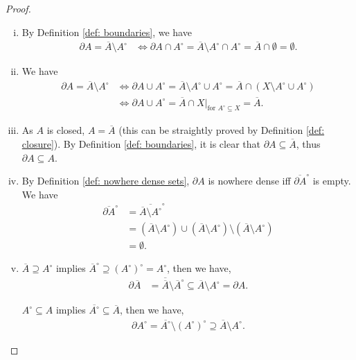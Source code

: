 \begin{proposition}
\begin{proof}
\begin{enumerate}[(i)]
			\item
			By Definition \ref{def: boundaries}, we have
			$$
			\begin{aligned}
				\partial A = \overline A \setminus A^\circ &\iff \partial A \cap A^\circ = \overline A \setminus A^\circ \cap A^\circ = \overline A \cap \emptyset = \emptyset.
			\end{aligned}
			$$
			
			\item
			We have
			$$
			\begin{aligned}
				\partial A = \overline A \setminus A^\circ &\iff \partial A \cup A^\circ = \overline A \setminus A^\circ \cup A^\circ = \overline A \cap (X \setminus A^\circ \cup A^\circ) \\
				&\iff \partial A \cup A^\circ = \overline A \cap X |_\text{for $A^\circ \subseteq X$} = \overline A.
			\end{aligned}
			$$
			
			\item As $A$ is closed, $A = \overline A$ (this can be straightly proved by Definition \ref{def: closure}). By Definition \ref{def: boundaries}, it is clear that $\partial A \subseteq \overline A$, thus $\partial A \subseteq A$.
			
			\item
			By Definition \ref{def: nowhere dense sets}, $\partial A$ is nowhere dense iff $\overline{\partial A}^\circ$ is empty. We have
			$$
			\begin{aligned}
				\overline{\partial A}^\circ &= \overline{\overline A \setminus A^\circ}^\circ \\
				&= (\overline A \setminus A^\circ) \cup (\overline A \setminus A^\circ) \setminus (\overline A \setminus A^\circ) \\
				&= \emptyset.
			\end{aligned}			
			$$
			
			\item
			$\overline A \supseteq A^\circ$ implies $\overline A^\circ \supseteq (A^\circ)^\circ = A^\circ$, then we have,
			$$
			\begin{aligned}
				\partial \overline A &= \overline{\overline A} \setminus  \overline A^\circ \subseteq \overline A \setminus A^\circ = \partial A.
			\end{aligned}
			$$
			
			$A^\circ \subseteq A$ implies $ \overline{A^\circ} \subseteq \overline A$, then we have,
			$$
			\begin{aligned}
				\partial A^\circ = \overline{A^\circ} \setminus (A^\circ)^\circ \supseteq \overline A \setminus A^\circ.
			\end{aligned}
			$$
			

\end{enumerate}
\end{proof}
\end{proposition}
